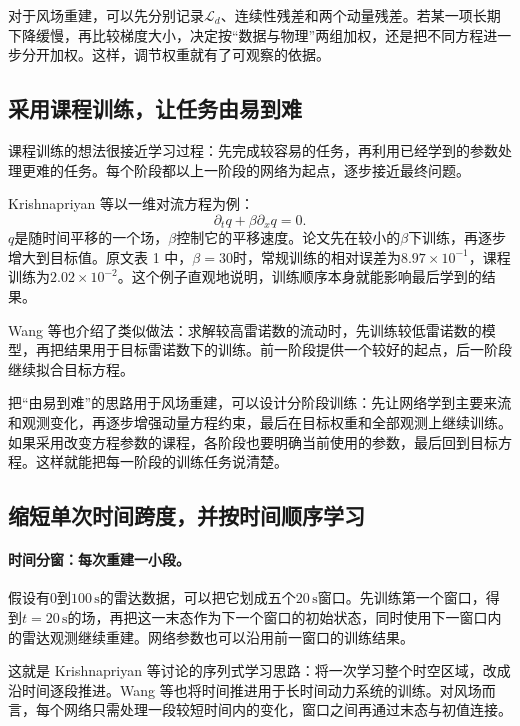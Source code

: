对于风场重建，可以先分别记录$\mathcal L_d$、连续性残差和两个动量残差。若某一项长期下降缓慢，再比较梯度大小，决定按“数据与物理”两组加权，还是把不同方程进一步分开加权。这样，调节权重就有了可观察的依据。

\subsection{采用课程训练，让任务由易到难}
课程训练的想法很接近学习过程：先完成较容易的任务，再利用已经学到的参数处理更难的任务。每个阶段都以上一阶段的网络为起点，逐步接近最终问题。

Krishnapriyan 等以一维对流方程为例：
\begin{equation}
 \partial_tq+\beta\partial_xq=0.
 \label{eq:pinn-curriculum-convection}
\end{equation}
$q$是随时间平移的一个场，$\beta$控制它的平移速度。论文先在较小的$\beta$下训练，再逐步增大到目标值。原文表 1 中，$\beta=30$时，常规训练的相对误差为$8.97\times10^{-1}$，课程训练为$2.02\times10^{-2}$\cite{krishnapriyan2021failure}。这个例子直观地说明，训练顺序本身就能影响最后学到的结果。

Wang 等也介绍了类似做法：求解较高雷诺数的流动时，先训练较低雷诺数的模型，再把结果用于目标雷诺数下的训练\cite{wang2023expert}。前一阶段提供一个较好的起点，后一阶段继续拟合目标方程。

把“由易到难”的思路用于风场重建，可以设计分阶段训练：先让网络学到主要来流和观测变化，再逐步增强动量方程约束，最后在目标权重和全部观测上继续训练。如果采用改变方程参数的课程，各阶段也要明确当前使用的参数，最后回到目标方程。这样就能把每一阶段的训练任务说清楚。

\subsection{缩短单次时间跨度，并按时间顺序学习}
\paragraph{时间分窗：每次重建一小段。}
假设有$0$到$100\,\mathrm{s}$的雷达数据，可以把它划成五个$20\,\mathrm{s}$窗口。先训练第一个窗口，得到$t=20\,\mathrm{s}$的场，再把这一末态作为下一个窗口的初始状态，同时使用下一窗口内的雷达观测继续重建。网络参数也可以沿用前一窗口的训练结果。

这就是 Krishnapriyan 等讨论的序列式学习思路：将一次学习整个时空区域，改成沿时间逐段推进\cite{krishnapriyan2021failure}。Wang 等也将时间推进用于长时间动力系统的训练\cite{wang2023expert}。对风场而言，每个网络只需处理一段较短时间内的变化，窗口之间再通过末态与初值连接。

